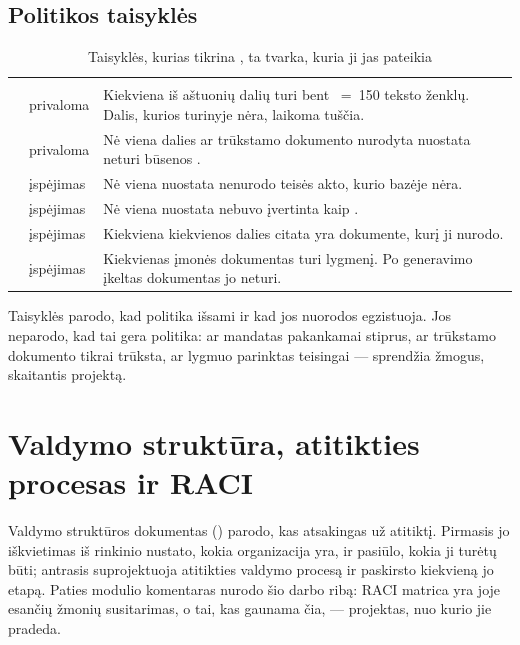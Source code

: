 \subsection{Politikos taisyklės}

\begin{xltabular}{\textwidth}{@{}L{37mm}L{17mm}Y@{}}
\caption{Taisyklės, kurias tikrina , ta tvarka, kuria ji jas pateikia}\label{tab:programme:policyrules}\\
\toprule
{} &  &  \\
\midrule
\endfirsthead
\toprule
{} &  &  \\
\midrule
\endhead
\bottomrule
\endlastfoot
{} & privaloma & Kiekviena iš aštuonių dalių turi bent ~=~150 teksto ženklų. Dalis, kurios turinyje nėra, laikoma tuščia. \\
 & privaloma & Nė viena dalies ar trūkstamo dokumento nurodyta nuostata neturi būsenos . \\
 & įspėjimas & Nė viena nuostata nenurodo teisės akto, kurio bazėje nėra. \\
 & įspėjimas & Nė viena nuostata nebuvo įvertinta kaip . \\
 & įspėjimas & Kiekviena kiekvienos dalies citata yra dokumente, kurį ji nurodo. \\
 & įspėjimas & Kiekvienas įmonės dokumentas turi lygmenį. Po generavimo įkeltas dokumentas jo neturi. \\
\end{xltabular}

Taisyklės parodo, kad politika išsami ir kad jos nuorodos egzistuoja. Jos neparodo, kad tai
gera politika: ar mandatas pakankamai stiprus, ar trūkstamo dokumento tikrai trūksta, ar
lygmuo parinktas teisingai --- sprendžia žmogus, skaitantis projektą.


\section{Valdymo struktūra, atitikties procesas ir RACI}\label{sec:programme:governance}

Valdymo struktūros dokumentas () parodo, kas atsakingas už
atitiktį. Pirmasis jo iškvietimas iš rinkinio nustato, kokia organizacija yra, ir pasiūlo,
kokia ji turėtų būti; antrasis suprojektuoja atitikties valdymo procesą ir paskirsto kiekvieną
jo etapą. Paties modulio komentaras nurodo šio darbo ribą: RACI matrica yra joje esančių žmonių
susitarimas, o tai, kas gaunama čia, --- projektas, nuo kurio jie pradeda.

